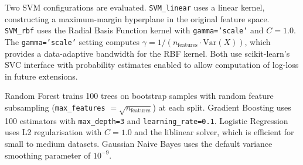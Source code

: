\documentclass[conference]{IEEEtran}
\begin{document}
Two SVM configurations are evaluated. \texttt{SVM\_linear} uses a linear kernel, constructing a maximum-margin hyperplane in the original feature space. \texttt{SVM\_rbf} uses the Radial Basis Function kernel with \texttt{gamma='scale'} and $C=1.0$. The \texttt{gamma='scale'} setting computes $\gamma = 1 / (n_{\text{features}} \cdot \text{Var}(X))$, which provides a data-adaptive bandwidth for the RBF kernel. Both use scikit-learn's SVC interface with probability estimates enabled to allow computation of log-loss in future extensions.

Random Forest trains 100 trees on bootstrap samples with random feature subsampling (\texttt{max\_features} $= \sqrt{n_{\text{features}}}$) at each split. Gradient Boosting uses 100 estimators with \texttt{max\_depth=3} and \texttt{learning\_rate=0.1}. Logistic Regression uses L2 regularisation with $C=1.0$ and the liblinear solver, which is efficient for small to medium datasets. Gaussian Naive Bayes uses the default variance smoothing parameter of $10^{-9}$.
\end{document}
